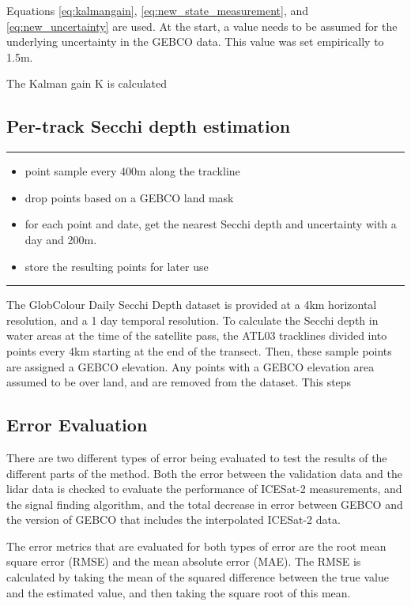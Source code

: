 Equations \ref{eq:kalmangain}, \ref{eq:new_state_measurement}, and \ref{eq:new_uncertainty} are used. At the start, a value needs to be assumed for the underlying uncertainty in the GEBCO data. This value was set empirically to 1.5m. 

The Kalman gain K is calculated

\subsection{Per-track Secchi depth estimation}
\rule{\textwidth}{1pt}
\begin{itemize}
    \item point sample every 400m along the trackline
    \item drop points based on a GEBCO land mask
    \item for each point and date, get the nearest Secchi depth and uncertainty with a day and 200m.
    \item store the resulting points for later use
\end{itemize}
\rule{\textwidth}{1pt}

The GlobColour Daily Secchi Depth dataset is provided at a 4km horizontal resolution, and a 1 day temporal resolution. To calculate the Secchi depth in water areas at the time of the satellite pass, the ATL03 tracklines divided into points every 4km starting at the end of the transect. Then, these sample points are assigned a GEBCO elevation. Any points with a GEBCO elevation area assumed to be over land, and are removed from the dataset. This steps 



\subsection{Error Evaluation}

There are two different types of error being evaluated to test the results of the different parts of the method. Both the error between the validation data and the lidar data is checked to evaluate the performance of ICESat-2 measurements, and the signal finding algorithm, and the total decrease in error between GEBCO and the version of GEBCO that includes the interpolated ICESat-2 data. 

The error metrics that are evaluated for both types of error are the root mean square error (RMSE) and the mean absolute error (MAE). The RMSE is calculated by taking the mean of the squared difference between the true value and the estimated value, and then taking the square root of this mean.

